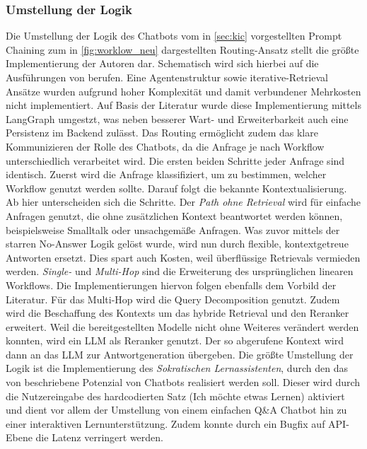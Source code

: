 \subsubsection{Umstellung der Logik}
Die Umstellung der Logik des Chatbots vom in \autoref{sec:kic} vorgestellten Prompt Chaining zum in \autoref{fig:worklow_neu} dargestellten Routing-Ansatz stellt die größte Implementierung der Autoren dar. Schematisch wird sich hierbei auf die Ausführungen von  berufen. Eine Agentenstruktur sowie iterative-Retrieval Ansätze wurden aufgrund hoher Komplexität und damit verbundener Mehrkosten nicht implementiert. Auf Basis der Literatur wurde diese Implementierung mittels LangGraph umgestzt, was neben besserer Wart- und Erweiterbarkeit auch eine Persistenz im Backend zulässt. Das Routing ermöglicht zudem das klare Kommunizieren der Rolle des Chatbots, da die Anfrage je nach Workflow unterschiedlich verarbeitet wird. Die ersten beiden Schritte jeder Anfrage sind identisch. Zuerst wird die Anfrage klassifiziert, um zu bestimmen, welcher Workflow genutzt werden sollte. Darauf folgt die bekannte Kontextualisierung. Ab hier unterscheiden sich die Schritte. Der \textit{Path ohne Retrieval} wird für einfache Anfragen genutzt, die ohne zusätzlichen Kontext beantwortet werden können, beispielsweise Smalltalk oder unsachgemäße Anfragen. Was zuvor mittels der starren No-Answer Logik gelöst wurde, wird nun durch flexible, kontextgetreue Antworten ersetzt. Dies spart auch Kosten, weil überflüssige Retrievals vermieden werden. \textit{Single-} und \textit{Multi-Hop} sind die Erweiterung des ursprünglichen linearen Workflows. Die Implementierungen hiervon folgen ebenfalls dem Vorbild der Literatur. Für das Multi-Hop wird die Query Decomposition genutzt. Zudem wird die Beschaffung des Kontexts um das hybride Retrieval und den Reranker erweitert. Weil die bereitgestellten Modelle nicht ohne Weiteres verändert werden konnten, wird ein LLM als Reranker genutzt. Der so abgerufene Kontext wird dann an das LLM zur Antwortgeneration übergeben. Die größte Umstellung der Logik ist die Implementierung des \textit{Sokratischen Lernassistenten}, durch den das von  beschriebene Potenzial von Chatbots realisiert werden soll. Dieser wird durch die Nutzereingabe des hardcodierten Satz (\glqq Ich möchte etwas Lernen\grqq) aktiviert und dient vor allem der Umstellung von einem einfachen Q\&A Chatbot hin zu einer interaktiven Lernunterstützung. Zudem konnte durch ein Bugfix auf API-Ebene die Latenz verringert werden.

